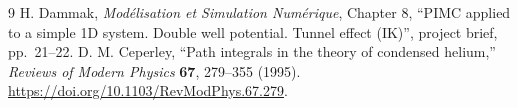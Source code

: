 \documentclass[11pt,a4paper]{report}
\begin{document}
\begin{thebibliography}{9}
 H. Dammak, \emph{Mod\'elisation et Simulation Num\'erique}, Chapter 8, ``PIMC applied to a simple 1D system. Double well potential. Tunnel effect (IK)'', project brief, pp.~21--22.
 D. M. Ceperley, ``Path integrals in the theory of condensed helium,'' \emph{Reviews of Modern Physics} \textbf{67}, 279--355 (1995). \url{https://doi.org/10.1103/RevModPhys.67.279}.
\end{thebibliography}
\end{document}
